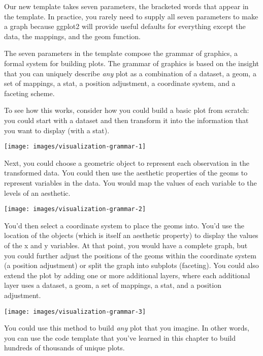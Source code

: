 \documentclass[]{book}
\begin{document}
Our new template takes seven parameters, the bracketed words that appear
in the template. In practice, you rarely need to supply all seven
parameters to make a graph because ggplot2 will provide useful defaults
for everything except the data, the mappings, and the geom function.

The seven parameters in the template compose the grammar of graphics, a
formal system for building plots. The grammar of graphics is based on
the insight that you can uniquely describe \emph{any} plot as a
combination of a dataset, a geom, a set of mappings, a stat, a position
adjustment, a coordinate system, and a faceting scheme.

To see how this works, consider how you could build a basic plot from
scratch: you could start with a dataset and then transform it into the
information that you want to display (with a stat).

\begin{center}\texttt{[image: images/visualization-grammar-1]} \end{center}

Next, you could choose a geometric object to represent each observation
in the transformed data. You could then use the aesthetic properties of
the geoms to represent variables in the data. You would map the values
of each variable to the levels of an aesthetic.

\begin{center}\texttt{[image: images/visualization-grammar-2]} \end{center}

You'd then select a coordinate system to place the geoms into. You'd use
the location of the objects (which is itself an aesthetic property) to
display the values of the x and y variables. At that point, you would
have a complete graph, but you could further adjust the positions of the
geoms within the coordinate system (a position adjustment) or split the
graph into subplots (faceting). You could also extend the plot by adding
one or more additional layers, where each additional layer uses a
dataset, a geom, a set of mappings, a stat, and a position adjustment.

\begin{center}\texttt{[image: images/visualization-grammar-3]} \end{center}

You could use this method to build \emph{any} plot that you imagine. In
other words, you can use the code template that you've learned in this
chapter to build hundreds of thousands of unique plots.
\end{document}
